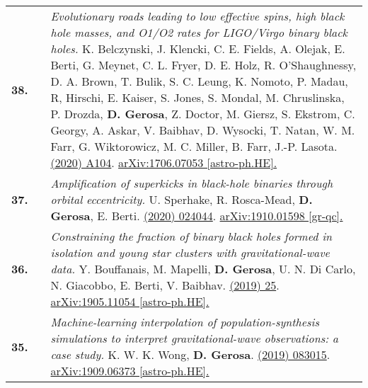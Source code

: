 {\begin{longtable}{rp{0.3cm}p{15.8cm}}
%
\textbf{38.} & & \textit{Evolutionary roads leading to low effective spins, high black hole masses, and O1/O2 rates for LIGO/Virgo binary black holes.}
\newline{}
K. Belczynski, J. Klencki, C. E. Fields, A. Olejak, E. Berti, G. Meynet, C. L. Fryer, D. E. Holz, R. O'Shaughnessy, D. A. Brown, T. Bulik, S. C. Leung,  K. Nomoto, P. Madau, R, Hirschi, E. Kaiser, S. Jones, S. Mondal, M. Chruslinska, P. Drozda, \textbf{D. Gerosa}, Z. Doctor, M. Giersz, S. Ekstr\:om, C. Georgy, A. Askar, V. Baibhav, D. Wysocki, T. Natan, W. M. Farr, G. Wiktorowicz, M. C. Miller, B. Farr, J.-P. Lasota.
\newline{}
\href{https://www.aanda.org/articles/aa/full_html/2020/04/aa36528-19/aa36528-19.html}{\aap 636 (2020) A104}. \href{https://arxiv.org/abs/1706.07053}{arXiv:1706.07053 [astro-ph.HE].}
\vspace{0.09cm}\\
%
\textbf{37.} & & \textit{Amplification of superkicks in black-hole binaries through orbital eccentricity.}
\newline{}
U. Sperhake, R. Rosca-Mead, \textbf{D. Gerosa}, E. Berti.
\newline{}
\href{https://journals.aps.org/prd/abstract/10.1103/PhysRevD.101.024044}{\prd 101 (2020) 024044}. \href{https://arxiv.org/abs/1910.01598}{arXiv:1910.01598 [gr-qc].}
\vspace{0.09cm}\\
%
\textbf{36.} & & \textit{Constraining the fraction of binary black holes formed in isolation and young star clusters with gravitational-wave data.}
\newline{}
Y. Bouffanais, M. Mapelli, \textbf{D. Gerosa}, U. N. Di Carlo, N. Giacobbo, E. Berti, V. Baibhav.
\newline{}
\href{https://iopscience.iop.org/article/10.3847/1538-4357/ab4a79}{\apj 886 (2019) 25}. \href{https://arxiv.org/abs/1905.11054}{arXiv:1905.11054 [astro-ph.HE].}
\vspace{0.09cm}\\
%
\textbf{35.} & & \textit{Machine-learning interpolation of population-synthesis simulations to interpret gravitational-wave observations: a case study.}
\newline{}
K. W. K. Wong, \textbf{D. Gerosa}.
\newline{}
\href{https://journals.aps.org/prd/abstract/10.1103/PhysRevD.100.083015}{\prd 100 (2019) 083015}. \href{https://arxiv.org/abs/1909.06373}{arXiv:1909.06373 [astro-ph.HE].}
\vspace{0.09cm}\\

\end{longtable}}

